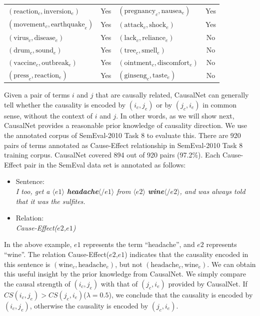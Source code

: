 \documentclass[letterpaper]{article}
\begin{document}
\begin{table}[bht]
\begin{tabular}{| l c | l c |}
$(\text{reaction}_c, \text{inversion}_e)$ & Yes & $(\text{pregnancy}_c, \text{nausea}_e)$ & Yes \\
$(\text{movement}_c, \text{earthquake}_e)$ & Yes & $(\text{attack}_c, \text{shock}_e)$ & Yes \\
$(\text{virus}_c, \text{disease}_e)$ & Yes & $(\text{lack}_c, \text{reliance}_e)$ & No \\
$(\text{drum}_c, \text{sound}_e)$ & Yes & $(\text{tree}_c, \text{smell}_e)$ & No \\
$(\text{vaccine}_c, \text{outbreak}_e)$ & Yes & $(\text{ointment}_c, \text{discomfort}_e)$ & No \\
$(\text{press}_c, \text{reaction}_e)$ & Yes & $(\text{ginseng}_c, \text{taste}_e)$ & No \\

\hline
\end{tabular}
\end{table}

Given a pair of terms $i$ and $j$ that are causally related,
CausalNet can generally tell whether the causality is encoded by $(i_c,j_e)$
or by $(j_c,i_e)$ in common sense, without the context of
$i$ and $j$. In other words, as we will show next, CausalNet
provides a reasonable prior knowledge of causality direction.
We use the annotated corpus of SemEval-2010 Task 8 to evaluate this.
There are 920 pairs of terms annotated as Cause-Effect relationship in
SemEval-2010 Task 8 training corpus. CausalNet covered 894 out of
920 pairs (97.2\%).
Each Cause-Effect pair in the SemEval data set is annotated as follows:
\begin{itemize}
  \item[] Sentence:\\
  {\em I too, get a $\langle e1\rangle$ \textbf{headache}$\langle/e1\rangle$
  from $\langle e2\rangle$ \textbf{wine}$\langle/e2\rangle$, and was always told that it was the sulfites.}
  \item[] Relation: \\ \emph{Cause-Effect($e2$,$e1$)}
\end{itemize}
In the above example, $e1$ represents the term ``headache'', and
$e2$ represents ``wine''. The relation Cause-Effect($e2$,$e1$)
indicates that the causality encoded in this sentence is
$(\text{wine}_c,\text{headache}_e)$,
but not
$(\text{headache}_c,\text{wine}_e)$.
We can obtain this useful
insight by the prior knowledge from CausalNet.
We simply compare the causal strength of
$(i_c,j_e)$ with that of $(j_c,i_e)$ provided by
CausalNet. If $CS(i_c,j_e) > CS(j_c,i_e)$($\lambda=0.5$), we
conclude that the causality is encoded by $(i_c,j_e)$,
otherwise the causality is encoded by $(j_c,i_e)$.
\end{document}
